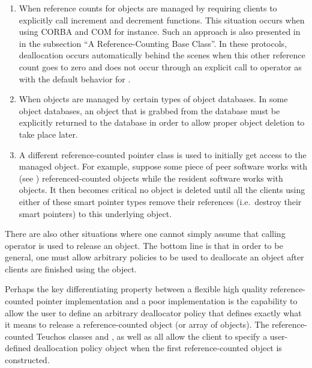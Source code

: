 \documentclass[pdf,ps2pdf,11pt]{SANDreport}
\begin{document}
\begin{enumerate}

{}\item When reference counts for objects are managed by requiring
clients to explicitly call increment and decrement functions.  This
situation occurs when using CORBA {}\cite{ref:corba} and COM
{}\cite{ref:com} for instance.  Such an approach is also presented in
{}\cite[Item 29]{MoreEffectiveC++96} in the subsection ``A
Reference-Counting Base Class''.  In these protocols, deallocation
occurs automatically behind the scenes when this other reference count
goes to zero and does not occur through an explicit call to operator
{} as with the default behavior for {}.

{}\item When objects are managed by certain types of object databases.
In some object databases, an object that is grabbed from the database
must be explicitly returned to the database in order to allow proper
object deletion to take place later.

{}\item A different reference-counted pointer class is used to
initially get access to the managed object.  For example, suppose some
piece of peer software works with {} (see
{}\cite{ref:boost}) referenced-counted objects while the resident
software works with {} objects.  It then becomes critical
no object is deleted until all the clients using either of these smart
pointer types remove their references (i.e.\ destroy their smart
pointers) to this underlying object.

\end{enumerate}

There are also other situations where one cannot simply assume that
calling operator {} is used to release an object.  The
bottom line is that in order to be general, one must allow arbitrary
policies to be used to deallocate an object after clients are finished
using the object.

Perhaps the key differentiating property between a flexible high
quality reference-counted pointer implementation and a poor
implementation is the capability to allow the user to define an
arbitrary deallocator policy that defines exactly what it means to
release a reference-counted object (or array of objects).  The
reference-counted Teuchos classes {} and
{}, as well as {} all
allow the client to specify a user-defined deallocation policy object
when the first reference-counted object is constructed.
\end{document}
